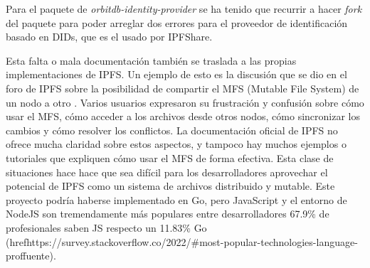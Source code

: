 Para el paquete de \textit{orbitdb-identity-provider} se ha tenido que recurrir a hacer \textit{fork} del paquete para poder arreglar
dos errores para el proveedor de identificación basado en DIDs, que es el usado por IPFShare.

Esta falta o mala documentación también se traslada a las propias implementaciones de IPFS. Un ejemplo de esto es la discusión que se dio en el foro de IPFS sobre la posibilidad de compartir el MFS (Mutable File System) de un nodo a otro \cite{ItPossibleShare}. Varios usuarios expresaron su frustración y confusión sobre cómo usar el MFS, cómo acceder a los archivos desde otros nodos, cómo sincronizar los cambios y cómo resolver los conflictos. La documentación oficial de IPFS no ofrece mucha claridad sobre estos aspectos, y tampoco hay muchos ejemplos o tutoriales que expliquen cómo usar el MFS de forma efectiva. Esta clase de situaciones hace hace que sea difícil para los desarrolladores aprovechar el potencial de IPFS como un sistema de archivos distribuido y mutable. Este proyecto podría haberse implementado en Go, pero JavaScript y el entorno de NodeJS son tremendamente más populares entre desarrolladores 67.9\% de profesionales saben JS respecto un 11.83\% Go (href{https://survey.stackoverflow.co/2022/#most-popular-technologies-language-prof}{fuente}).




